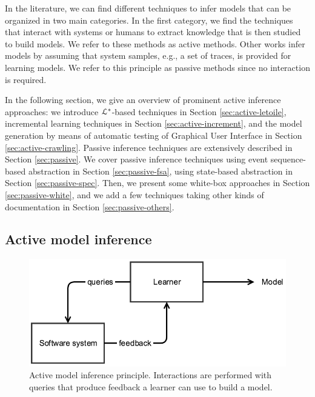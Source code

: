 In the literature, we can find different techniques to infer
models that can be organized in two main categories. In the first
category, we find the techniques that interact with systems or
humans to extract knowledge that is then studied to build models.
We refer to these methods as active methods. Other works infer
models by assuming that system samples, e.g., a set of traces, is
provided for learning models. We refer to this principle as
passive methods since no interaction is required.

In the following section, we give an overview of prominent active
inference approaches: we introduce $\EuScript{L}^*$-based
techniques in Section \ref{sec:active-letoile}, incremental
learning techniques in Section \ref{sec:active-increment}, and
the model generation by means of automatic testing of Graphical
User Interface in Section \ref{sec:active-crawling}. Passive
inference techniques are extensively described in Section
\ref{sec:passive}. We cover passive inference techniques using
event sequence-based abstraction in Section
\ref{sec:passive-fsa}, using state-based abstraction in Section
\ref{sec:passive-spec}. Then, we present some white-box
approaches in Section \ref{sec:passive-white}, and we add a few
techniques taking other kinds of documentation in Section
\ref{sec:passive-others}.


\subsection{Active model inference}
\label{sec:active}

\begin{figure}[h]
    \begin{center}
        \includegraphics[width=0.9\linewidth]{figures/active.png}
    \end{center}

    \caption{Active model inference principle. Interactions are
        performed with queries that produce feedback a learner
        can use to build a model.}
    \label{fig:active}
\end{figure}

